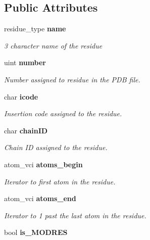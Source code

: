 \subsection*{Public Attributes}
\begin{CompactItemize}
\item 
residue\_\-type \bf{name}\label{classASCbase_1_1residue__t_d33ebf59abe10245839a2e3e976f28b6}

\begin{CompactList}\small\item\em 3 character name of the residue \item\end{CompactList}\item 
uint \bf{number}\label{classASCbase_1_1residue__t_f22f101c1c4287d1f7217e8a4a3ef882}

\begin{CompactList}\small\item\em Number assigned to residue in the PDB file. \item\end{CompactList}\item 
char \bf{icode}\label{classASCbase_1_1residue__t_9ba317e5ba32fc025f3405bce5bcfc3d}

\begin{CompactList}\small\item\em Insertion code assigned to the residue. \item\end{CompactList}\item 
char \bf{chain\-ID}\label{classASCbase_1_1residue__t_a22d41efc884bf49196aedf45456668d}

\begin{CompactList}\small\item\em Chain ID assigned to the residue. \item\end{CompactList}\item 
atom\_\-vci \bf{atoms\_\-begin}\label{classASCbase_1_1residue__t_a0aecc888b54e490610196493aae54c9}

\begin{CompactList}\small\item\em Iterator to first atom in the residue. \item\end{CompactList}\item 
atom\_\-vci \bf{atoms\_\-end}\label{classASCbase_1_1residue__t_9315cf7728dc09465af606000f04bcf7}

\begin{CompactList}\small\item\em Iterator to 1 past the last atom in the residue. \item\end{CompactList}\item 
bool \bf{is\_\-MODRES}\label{classASCbase_1_1residue__t_d37b0dfb9a32c77e2ae2c167008d39a3}


\end{CompactItemize}

